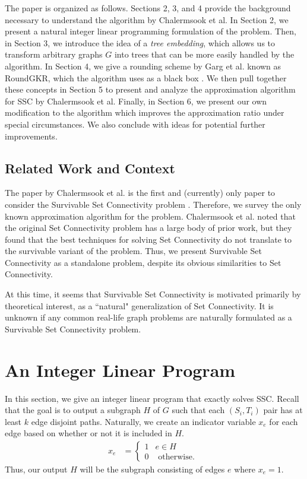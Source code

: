 \documentclass[12pt]{article}
\begin{document}
The paper is organized as follows. Sections 2, 3, and 4 provide the background necessary to understand the algorithm by Chalermsook et al. In Section 2, we present a natural integer linear programming formulation of the problem. Then, in Section 3, we introduce the idea of a \emph{tree embedding}, which allows us to transform arbitrary graphs $G$ into trees that can be more easily handled by the algorithm. In Section 4, we give a rounding scheme by Garg et al. known as RoundGKR, which the algorithm uses as a black box \cite{GKR}. We then pull together these concepts in Section 5 to present and analyze the approximation algorithm for SSC by Chalermsook et al. Finally, in Section 6, we present our own modification to the algorithm which improves the approximation ratio under special circumstances. We also conclude with ideas for potential further improvements.

\subsection{Related Work and Context}

The paper by Chalermsook et al. is the first and (currently) only paper to consider the Survivable Set Connectivity problem \cite{ssc}. Therefore, we survey the only known approximation algorithm for the problem. Chalermsook et al. noted that the original Set Connectivity problem has a large body of prior work, but they found that the best techniques for solving Set Connectivity do not translate to the survivable variant of the problem. Thus, we present Survivable Set Connectivity as a standalone problem, despite its obvious similarities to Set Connectivity.

At this time, it seems that Survivable Set Connectivity is motivated primarily by theoretical interest, as a ``natural" generalization of Set Connectivity. It is unknown if any common real-life graph problems are naturally formulated as a Survivable Set Connectivity problem.

\section{An Integer Linear Program}

In this section, we give an integer linear program that exactly solves SSC. Recall that the goal is to output a subgraph $H$ of $G$ such that each $(S_i,T_i)$ pair has at least $k$ edge disjoint paths. Naturally, we create an indicator variable $x_e$ for each edge based on whether or not it is included in $H$. 
\begin{align}
 x_e &= \left\{ \begin{array}{cc} 1 & e \in H \\
                                  0 & \text{ otherwise. } \end{array} \right.
\end{align}
Thus, our output $H$ will be the subgraph consisting of edges $e$ where $x_e = 1$. \\ \\
\end{document}
